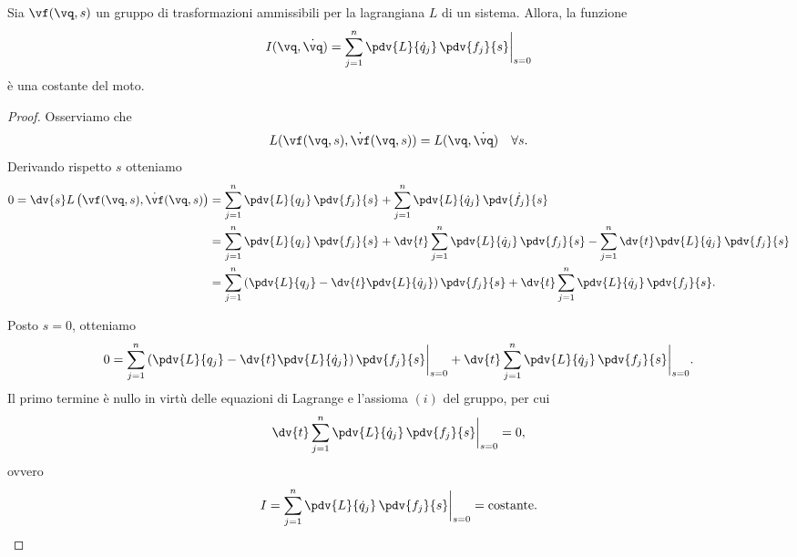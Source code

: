 \begin{theorem}[di Noether]
    Sia $\vf(\vq, s)$ un gruppo di trasformazioni ammissibili per la lagrangiana $L$ di un sistema. Allora, la funzione
    \begin{equation*}
        I(\vq, \dot{\vq}) = \sum_{j=1}^n \pdv{L}{\dot{q}_j}\,\pdv{f_j}{s}\bigg|_{s=0}
    \end{equation*}
    è una costante del moto.
\end{theorem}
\begin{proof}
    Osserviamo che
    \begin{equation*}
        L(\vf(\vq, s), \dot{\vf}(\vq, s)) = L(\vq, \dot{\vq}) \quad \forall s.
    \end{equation*}
    Derivando rispetto $s$ otteniamo
    \begin{align*}
        0 = \dv{s} L\left(\vf(\vq, s), \dot{\vf}(\vq, s)\right) &= \sum_{j=1}^n \pdv{L}{q_j}\,\pdv{f_j}{s} + \sum_{j=1}^n \pdv{L}{\dot{q}_j}\,\pdv{\dot{f_j}}{s} \\
        &= \sum_{j=1}^n \pdv{L}{q_j}\,\pdv{f_j}{s} + \dv{t}\sum_{j=1}^n \pdv{L}{\dot{q}_j}\,\pdv{f_j}{s} - \sum_{j=1}^n \dv{t}\pdv{L}{\dot{q}_j}\,\pdv{f_j}{s} \\
        &=  \sum_{j=1}^n \left(\pdv{L}{q_j} - \dv{t}\pdv{L}{\dot{q}_j}\right)\pdv{f_j}{s} + \dv{t}\sum_{j=1}^n \pdv{L}{\dot{q}_j}\,\pdv{f_j}{s}.
    \end{align*}

    Posto $s = 0$, otteniamo
    \begin{equation*}
        0 = \sum_{j=1}^n \left(\pdv{L}{q_j} - \dv{t}\pdv{L}{\dot{q}_j}\right)\pdv{f_j}{s}\bigg|_{s=0} + \dv{t}\sum_{j=1}^n \pdv{L}{\dot{q}_j}\,\pdv{f_j}{s}\bigg|_{s=0}.
    \end{equation*}
    Il primo termine è nullo in virtù delle equazioni di Lagrange e l'assioma $(i)$ del gruppo, per cui
    \begin{equation*}
        \dv{t}\sum_{j=1}^n \pdv{L}{\dot{q}_j}\,\pdv{f_j}{s}\bigg|_{s=0} = 0,
    \end{equation*}
    ovvero
    \begin{equation*}
        I = \sum_{j=1}^n \pdv{L}{\dot{q}_j}\,\pdv{f_j}{s}\bigg|_{s=0} = \text{costante}.
    \end{equation*}
\end{proof}

